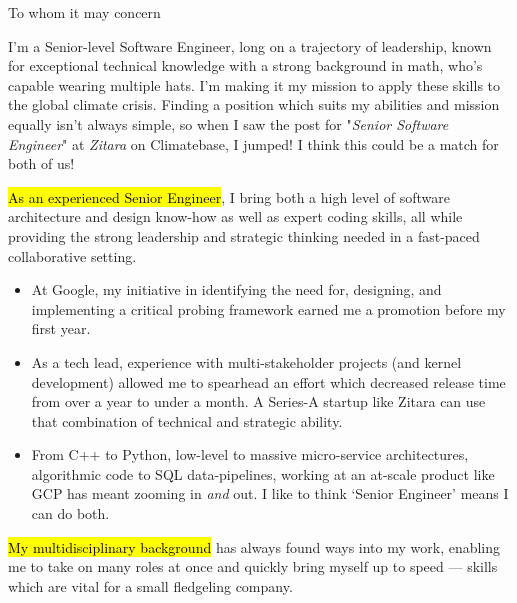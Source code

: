 \documentclass{tc_cv}
\begin{document}

\begin{adjustwidth}{38pt}{38pt}
  \large

  To whom it may concern\par \bigskip

  I'm a Senior-level Software Engineer, long on a trajectory of leadership,
  known for exceptional technical knowledge with a strong background in math,
  who's capable wearing multiple hats. I'm making it my mission to apply these
  skills to the global climate crisis.
  Finding a position which suits my
  abilities and mission equally isn't always simple, so when I saw the post for
  "\emph{Senior Software Engineer}" at \emph{Zitara} on Climatebase, I jumped!
  I think this could be a match for both of us! \medskip

  \hl{As an experienced Senior Engineer}, I bring both a high level of software
  architecture and design know-how as well as expert coding skills, all while
  providing the strong leadership and strategic thinking needed in a fast-paced
  collaborative setting.
  \begin{itemize}

    \item At Google, my initiative in identifying the need for, designing, and
      implementing a critical probing framework earned me a promotion before my
      first year.

    \item As a tech lead, experience with multi-stakeholder projects (and
      kernel development) allowed me to spearhead an effort which decreased
      release time from over a year to under a month. A Series-A startup like
      Zitara can use that combination of technical and strategic ability.

    \item From C++ to Python, low-level to massive micro-service architectures,
      algorithmic code to SQL data-pipelines, working at an at-scale product
      like GCP has meant zooming in \emph{and} out. I like to think `Senior
      Engineer' means I can do both.

  \end{itemize} \medskip

  \hl{My multidisciplinary background} has always found ways into my work,
  enabling me to take on many roles at once and quickly bring myself up to
  speed --- skills which are vital for a small fledgeling company.
  \begin{itemize}


\end{itemize}
\end{adjustwidth}
\end{document}
